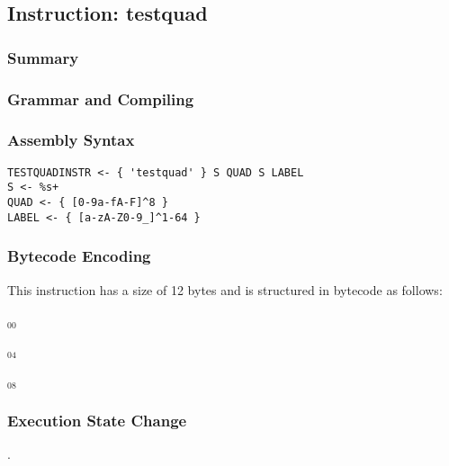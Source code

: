 \subsection{Instruction: testquad}

\subsubsection{Summary}


\subsubsection{Grammar and Compiling}


\subsubsection{Assembly Syntax}

\begin{myquote}
\begin{verbatim}
TESTQUADINSTR <- { 'testquad' } S QUAD S LABEL
S <- %s+
QUAD <- { [0-9a-fA-F]^8 }
LABEL <- { [a-zA-Z0-9_]^1-64 }
\end{verbatim}
\end{myquote}

\subsubsection{Bytecode Encoding}

This instruction has a size of 12 bytes and is structured in bytecode as follows:

$_{00}$\ 



$_{04}$\ 



$_{08}$\ 
\fbox{%
  \parbox{20pt}{%
00
  }%
}


\subsubsection{Execution State Change}

.


